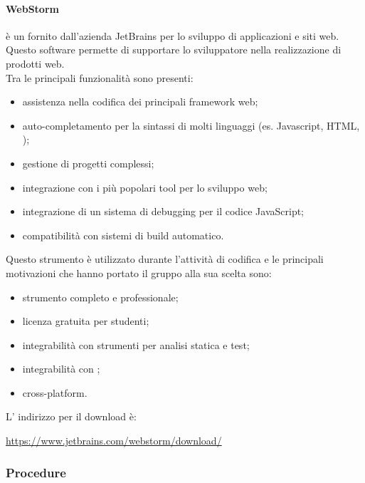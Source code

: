				\paragraph{WebStorm} \label{sec:WebStorm}
				 è un  fornito dall'azienda JetBrains per lo sviluppo di applicazioni e siti web.
				Questo software permette di supportare lo sviluppatore nella realizzazione di prodotti web. \\
				Tra le principali funzionalità sono presenti:
				\begin{itemize}
					\item assistenza nella codifica dei principali framework web;
					\item auto-completamento per la sintassi di molti linguaggi (es. Javascript, HTML, );
					\item gestione di progetti complessi;
					\item integrazione con i più popolari tool per lo sviluppo web;
					\item integrazione di un sistema di debugging per il codice JavaScript;
					\item compatibilità con sistemi di build automatico.
				\end{itemize}
				Questo strumento è utilizzato durante l'attività di codifica e le principali motivazioni che hanno portato il gruppo alla sua scelta sono:
				\begin{itemize}
					\item strumento completo e professionale;
					\item licenza gratuita per studenti;
					\item integrabilità con strumenti per analisi statica e test;
					\item integrabilità con ;
					\item cross-platform.
				\end{itemize}
				L' indirizzo per il download è:
				\begin{center}
					\url{https://www.jetbrains.com/webstorm/download/}
				\end{center}
        \subsubsection{Procedure}
